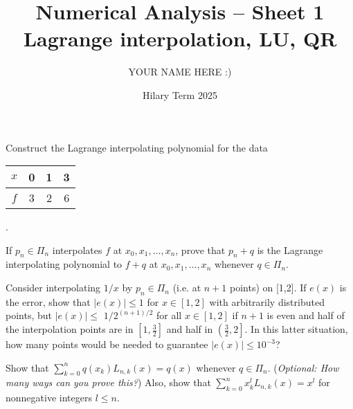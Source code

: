 \documentclass[answers]{exam}
\title{Numerical Analysis -- Sheet 1\\Lagrange interpolation, LU, QR}
\author{YOUR NAME HERE :)}
\date{Hilary Term 2025}
\begin{document}
\maketitle

\begin{questions}

\question%
Construct the Lagrange interpolating polynomial for the data \begin{tabular}{c|ccc}
	$x$ & 0 & 1 & 3 \\\hline
	$f$ & 3 & 2 & 6 \\
\end{tabular}.



\question%
If $p_{n} \in \Pi_{n}$ interpolates $f$ at $x_{0}, x_{1}, \ldots, x_{n}$, prove that $p_{n}+q$ is the Lagrange interpolating polynomial to $f+q$ at $x_{0}, x_{1}, \ldots, x_{n}$ whenever $q \in \Pi_{n}$.



\question%
Consider interpolating $1 / x$ by $p_{n} \in \Pi_{n}$ (i.e. at $n+1$ points) on [1,2]. If $e(x)$ is the error, show that $|e(x)| \leqslant 1$ for $x \in[1,2]$ with arbitrarily distributed points, but $|e(x)| \leqslant$ $1 / 2^{(n+1) / 2}$ for all $x \in[1,2]$ if $n+1$ is even and half of the interpolation points are in $\left[1, \frac{3}{2}\right]$ and half in $\left(\frac{3}{2}, 2\right]$. In this latter situation, how many points would be needed to guarantee $|e(x)| \leqslant 10^{-3}$?



\question%
Show that $\sum_{k=0}^{n} q(x_{k}) L_{n, k}(x)=q(x)$ whenever $q \in \Pi_{n}$. (\emph{Optional: How many ways can you prove this?}) Also, show that $\sum_{k=0}^{n} x_{k}^{l} L_{n, k}(x)=x^{l}$ for nonnegative integers $l \leqslant n$.



\question%
\end{questions}
\end{document}
